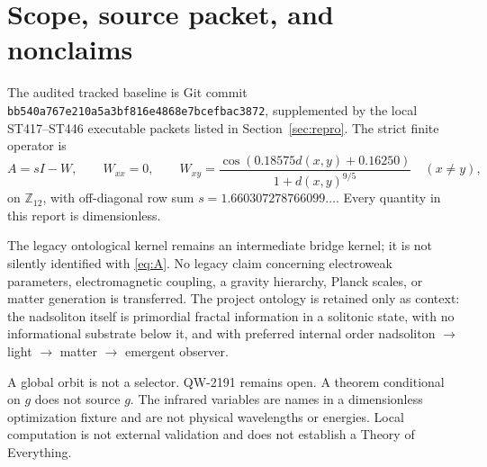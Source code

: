 \documentclass[11pt,a4paper]{article}
\begin{document}
\tableofcontents
\newpage

\section{Scope, source packet, and nonclaims}

The audited tracked baseline is Git commit
\texttt{bb540a767e210a5a3bf816e4868e7bcefbac3872}, supplemented by the local
ST417--ST446 executable packets listed in Section~\ref{sec:repro}.  The strict
finite operator is
\begin{equation}\label{eq:A}
 A=sI-W,\qquad W_{xx}=0,\qquad
 W_{xy}=\frac{\cos(0.18575d(x,y)+0.16250)}{1+d(x,y)^{9/5}}\quad(x\ne y),
\end{equation}
on $\mathbb Z_{12}$, with off-diagonal row sum
$s=1.660307278766099\ldots$.  Every quantity in this report is
dimensionless.

The legacy ontological kernel remains an intermediate bridge kernel; it is not
silently identified with \eqref{eq:A}.  No legacy claim concerning
electroweak parameters, electromagnetic coupling, a gravity hierarchy,
Planck scales, or matter generation is transferred.  The project ontology is
retained only as context: the nadsoliton itself is primordial fractal
information in a solitonic state, with no informational substrate below it,
and with preferred internal order nadsoliton $\to$ light $\to$ matter $\to$
emergent observer.

A global orbit is not a selector.  QW-2191 remains open.  A theorem conditional
on $g$ does not source $g$.  The infrared variables are names in a
dimensionless optimization fixture and are not physical wavelengths or
energies.  Local computation is not external validation and does not establish
a Theory of Everything.
\end{document}
